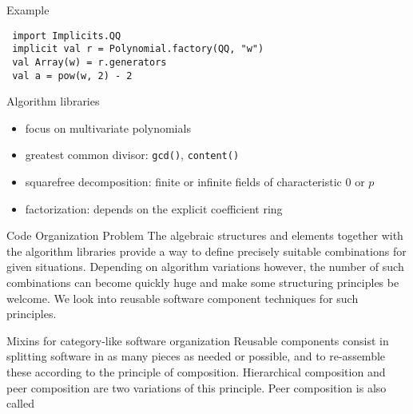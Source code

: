 \documentclass[final]{beamer}
\newcommand{\code}[1]{\texttt{#1}}
\begin{document}
\begin{frame}[fragile]
\begin{columns}[t]
\begin{column}{.3\linewidth}
  \begin{block}{\large Example}
\tiny 
\begin{lstlisting} 
 import Implicits.QQ
 implicit val r = Polynomial.factory(QQ, "w")
 val Array(w) = r.generators
 val a = pow(w, 2) - 2 
\end{lstlisting} 
  \end{block}
  \hfill
  \begin{block}{\large Algorithm libraries}
  \scriptsize 
  \begin{itemize}
  \item focus on multivariate polynomials
  \item greatest common divisor: \code{gcd()}, \code{content()}
  \item squarefree decomposition: finite or infinite fields of characteristic 0 or $p$
  \item factorization: depends on the explicit coefficient ring
  \end{itemize}
  \end{block}
  \hfill
  \begin{block}{\large Code Organization Problem}
  \scriptsize
The algebraic structures and elements together with the algorithm
libraries provide a way to define precisely suitable combinations
for given situations. Depending on algorithm variations however,
the number of such combinations can become quickly huge and make
some structuring principles be welcome. We look into reusable
software component techniques for such principles.
  \end{block}
  \hfill
  \begin{block}{\large Mixins for category-like software organization}
{\scriptsize %
Reusable components consist in splitting software in as many pieces
as needed or possible, and to re-assemble these according to the
principle of composition. Hierarchical composition and peer composition
are two variations of this principle. Peer composition is also called
}
\end{block}
\end{column}
\end{columns}
\end{frame}
\end{document}
